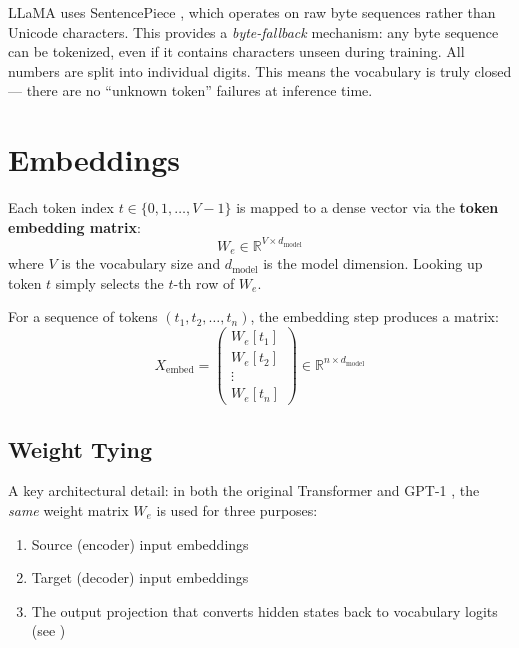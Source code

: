\documentclass[11pt,a4paper]{article}
\newcommand{\R}{\mathbb{R}}
\newcommand{\dmodel}{d_{\text{model}}}
\begin{document}
\begin{implbox}
LLaMA uses SentencePiece \cite{touvron2023}, which operates on raw byte sequences
rather than Unicode characters. This provides a \emph{byte-fallback} mechanism: any byte
sequence can be tokenized, even if it contains characters unseen during training. All
numbers are split into individual digits. This means the vocabulary is truly closed ---
there are no ``unknown token'' failures at inference time.
\end{implbox}


\section{Embeddings}
\label{sec:embeddings}

Each token index $t \in \{0, 1, \ldots, V-1\}$ is mapped to a dense vector via the
\textbf{token embedding matrix}:
\begin{equation}
  W_e \in \R^{V \times \dmodel}
\end{equation}
where $V$ is the vocabulary size and $\dmodel$ is the model dimension. Looking up token
$t$ simply selects the $t$-th row of $W_e$.

For a sequence of tokens $(t_1, t_2, \ldots, t_n)$, the embedding step produces a matrix:
\begin{equation}
  X_{\text{embed}} = \begin{pmatrix} W_e[t_1] \\ W_e[t_2] \\ \vdots \\ W_e[t_n] \end{pmatrix}
  \in \R^{n \times \dmodel}
\end{equation}

\subsection{Weight Tying}
\label{sec:weight-tying}

A key architectural detail: in both the original Transformer \cite{vaswani2017} and GPT-1
\cite{radford2018}, the \emph{same} weight matrix $W_e$ is used for three purposes:

\begin{enumerate}[nosep]
  \item Source (encoder) input embeddings
  \item Target (decoder) input embeddings
  \item The output projection that converts hidden states back to vocabulary logits
    (see )
\end{enumerate}
\end{document}
